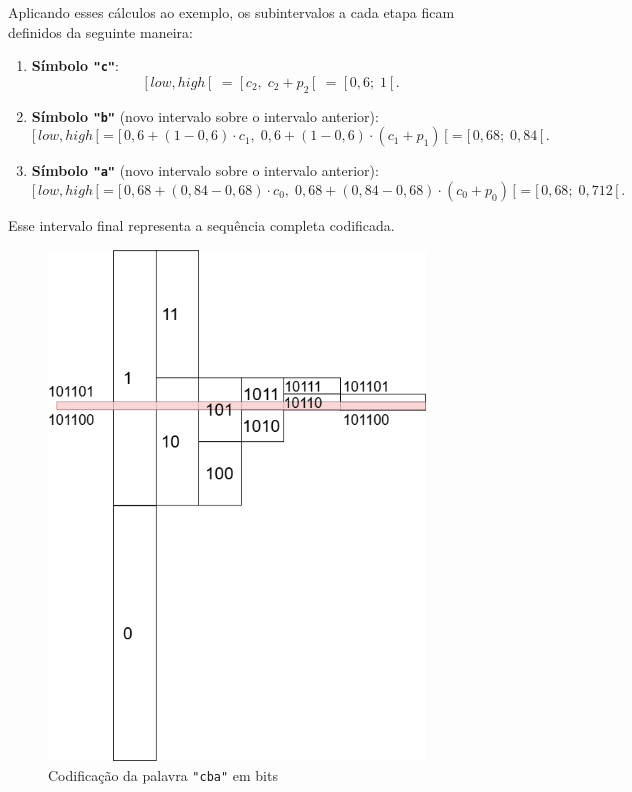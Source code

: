 Aplicando esses cálculos ao exemplo, os subintervalos a cada etapa ficam definidos da seguinte maneira:

\begin{enumerate}
    \item \textbf{Símbolo \texttt{"c"}}:
    \[
    [\,low, high\,[ ~~ = ~ [\,c_2,\; c_2 + p_2\,[ ~~ = ~ [\,0{,}6;\;1\,[\,.
    \]

    \item \textbf{Símbolo \texttt{"b"}} (novo intervalo sobre o intervalo anterior):
    \[
    [\,low, high\,[ = [\,0{,}6 + (1 - 0{,}6)\cdot c_1,\; 0{,}6 + (1 - 0{,}6)\cdot (c_1 + p_1)\,[ = [\,0{,}68;\;0{,}84\,[\,.
    \]

    \item \textbf{Símbolo \texttt{"a"}} (novo intervalo sobre o intervalo anterior):
    \[
    [\,low, high\,[ = [\,0{,}68 + (0{,}84 - 0{,}68)\cdot c_0,\; 0{,}68 + (0{,}84 - 0{,}68)\cdot (c_0 + p_0)\,[ = [\,0{,}68;\;0{,}712\,[\,.
    \]
\end{enumerate}

Esse intervalo final representa a sequência completa codificada.

\begin{figure}[ht]
	\centering
	\caption{Codificação da palavra \texttt{"cba"} em bits}
	\label{fig:DiagramasTCC-Diagramas-Aritmetic-Encoding-Bits}
	\includegraphics[width=10cm]{figuras/DiagramasTCC-Diagramas-Aritmetic-Encoding-Bits}
\end{figure}


